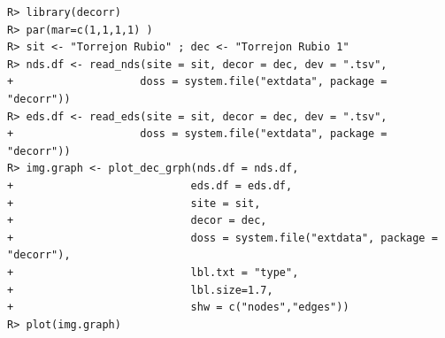 \documentclass[article]{jss}\usepackage{knitr}
\begin{document}
\begin{kframe}
\begin{verbatim}
R> library(decorr)
R> par(mar=c(1,1,1,1) )
R> sit <- "Torrejon Rubio" ; dec <- "Torrejon Rubio 1"
R> nds.df <- read_nds(site = sit, decor = dec, dev = ".tsv",
+                    doss = system.file("extdata", package = "decorr"))
R> eds.df <- read_eds(site = sit, decor = dec, dev = ".tsv",
+                    doss = system.file("extdata", package = "decorr"))
R> img.graph <- plot_dec_grph(nds.df = nds.df,
+                            eds.df = eds.df,
+                            site = sit,
+                            decor = dec,
+                            doss = system.file("extdata", package = "decorr"),
+                            lbl.txt = "type",
+                            lbl.size=1.7,
+                            shw = c("nodes","edges"))
R> plot(img.graph)
\end{verbatim}
\end{kframe}\begin{figure}[H]


\end{figure}
\end{document}

